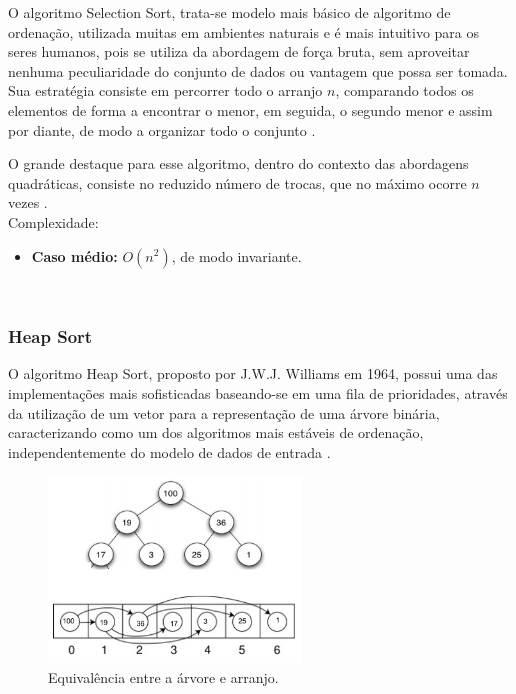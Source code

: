 \documentclass[conference,onecolumn]{IEEEtran}
\begin{document}
O algoritmo Selection Sort, trata-se modelo mais básico de algoritmo de ordenação, utilizada muitas em ambientes naturais e é mais intuitivo para os seres humanos, pois se utiliza da abordagem de força bruta, sem aproveitar nenhuma peculiaridade do conjunto de dados ou vantagem que possa ser tomada. Sua estratégia consiste em percorrer todo o arranjo $n$, comparando todos os elementos de forma a encontrar o menor, em seguida, o segundo menor e assim por diante, de modo a organizar todo o conjunto \cite{ziviani}\cite{biggar}.

O grande destaque para esse algoritmo, dentro do contexto das abordagens quadráticas, consiste no reduzido número de trocas, que no máximo ocorre $n$ vezes \cite{biggar}.\\

Complexidade:
\begin{itemize}
\item \textbf{Caso médio:} $O (n^2)$, de modo invariante.
\end{itemize}

~\\
\subsubsection{Heap Sort}

O algoritmo Heap Sort, proposto por J.W.J. Williams em 1964, possui uma das implementações mais sofisticadas baseando-se em uma fila de prioridades, através da utilização de um vetor para a representação de uma árvore binária, caracterizando como um dos algoritmos mais estáveis de ordenação, independentemente do modelo de dados de entrada \cite{ziviani}. 

\begin{figure}[H]
  
  \centering
    \includegraphics[width=0.6\textwidth]{images/heapsort.jpg}
  \caption{Equivalência entre a árvore e arranjo.}
      \label{image:arvore}
\end{figure}
\end{document}
